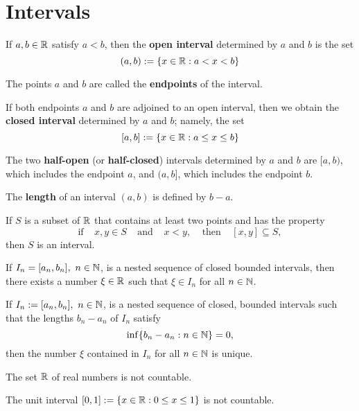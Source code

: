 \section{Intervals}

\begin{definition}
	If $a,b \in \mathbb{R}$ satisfy $a<b$, then the \textbf{open interval} determined by $a$ and $b$ is the set
	\[(a,b):= \{x \in \mathbb{R} : a <x < b\}\]

	The points $a$ and $b$ are called the \textbf{endpoints} of the interval.
\end{definition}

\begin{definition}
	If both endpoints $a$ and $b$ are adjoined to an open interval, then we obtain the \textbf{closed interval} determined by $a$ and $b$; namely, the set
	\[[a,b]:=\{x \in \mathbb{R} : a \leq x \leq b\}\]
\end{definition}

\begin{definition}
	The two \textbf{half-open} (or \textbf{half-closed}) intervals determined by $a$ and $b$ are $[a,b)$, which includes the endpoint $a$, and $(a,b]$, which includes the endpoint $b$.
\end{definition}

\begin{definition}
	The \textbf{length} of an interval $(a,b)$ is defined by $b-a$.
\end{definition}

\begin{theorem}
	If $S$ is a subset of $\mathbb{R}$ that contains at least two points and has the property
	\[\text{if}\ \ \ \ \ x,y \in S\ \ \ \ \ \text{and}\ \ \ \ \ x < y,\ \ \ \ \ \text{then}\ \ \ \ \  [x,y] \subseteq S,\]
	then $S$ is an interval.
\end{theorem}

\begin{theorem}
	If $I_n=[a_n,b_n],\ n \in \mathbb{N}$, is a nested sequence of closed bounded intervals, then there exists a number $\xi \in \mathbb{R}$ such that $\xi \in I_n$ for all $n \in \mathbb{N}$.
\end{theorem}

\begin{theorem}
	If $I_n :=[a_n,b_n],\ n \in \mathbb{N}$, is a nested sequence of closed, bounded intervals such that the lengths $b_n-a_n$ of $I_n$ satisfy
	\[\inf \{b_n - a_n : n \in \mathbb{N}\}=0,\]
	then the number $\xi$ contained in $I_n$ for all $n \in \mathbb{N}$ is unique.
\end{theorem}

\begin{theorem}
	The set $\mathbb{R}$ of real numbers is not countable.
\end{theorem}

\begin{theorem}
	The unit interval $[0,1] := \{x \in \mathbb{R} : 0 \leq x \leq 1\}$ is not countable.
\end{theorem}
